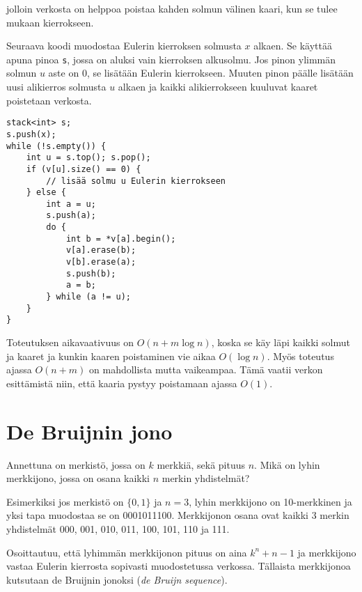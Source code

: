 jolloin verkosta on helppoa poistaa kahden solmun
välinen kaari, kun se tulee mukaan kierrokseen.

Seuraava koodi muodostaa Eulerin kierroksen
solmusta $x$ alkaen.
Se käyttää apuna pinoa \texttt{s},
jossa on aluksi vain kierroksen alkusolmu.
Jos pinon ylimmän solmun $u$ aste on 0,
se lisätään Eulerin kierrokseen.
Muuten pinon päälle lisätään uusi alikierros
solmusta $u$ alkaen ja kaikki alikierrokseen
kuuluvat kaaret poistetaan verkosta.

\begin{lstlisting}
stack<int> s;
s.push(x);
while (!s.empty()) {
    int u = s.top(); s.pop();
    if (v[u].size() == 0) {
        // lisää solmu u Eulerin kierrokseen
    } else {
        int a = u;
        s.push(a);
        do {
            int b = *v[a].begin();
            v[a].erase(b);
            v[b].erase(a);
            s.push(b);
            a = b;
        } while (a != u);
    }
}
\end{lstlisting}
Toteutuksen aikavaativuus on $O(n+m \log n)$,
koska se käy läpi kaikki solmut ja kaaret
ja kunkin kaaren poistaminen vie aikaa $O(\log n)$.
Myös toteutus ajassa $O(n+m)$
on mahdollista mutta vaikeampaa.
Tämä vaatii verkon esittämistä niin,
että kaaria pystyy poistamaan ajassa $O(1)$.

\section{De Bruijnin jono}


\begin{task}
Annettuna on merkistö,
jossa on $k$ merkkiä, sekä pituus $n$.
Mikä on lyhin merkkijono, jossa on osana
kaikki $n$ merkin yhdistelmät?
\end{task}

Esimerkiksi jos merkistö on $\{0,1\}$
ja $n=3$, lyhin merkkijono on 10-merkkinen
ja yksi tapa muodostaa se on 0001011100.
Merkkijonon osana ovat kaikki 3 merkin yhdistelmät
000, 001, 010, 011, 100, 101, 110 ja 111.

Osoittautuu, että lyhimmän merkkijonon
pituus on aina $k^n+n-1$ ja merkkijono
vastaa Eulerin kierrosta sopivasti
muodostetussa verkossa.
Tällaista merkkijonoa kutsutaan
de Bruijnin jonoksi (\textit{de Bruijn sequence}).

